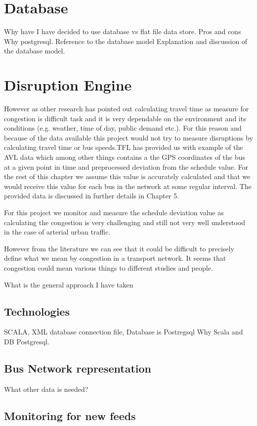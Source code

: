 \section{Database}
Why have I have decided to use database vs flat file data store. Pros and cons
Why postgresql. Reference to the database model
Explanation and discussion of the database model.

\section{Disruption Engine}
However as other research has pointed out \cite{1251929} calculating travel time as measure for congestion is difficult task and it is very dependable on the environment and its conditions (e.g. weather, time of day, public demand etc.). For this reason and because of the data available this project would not try to measure disruptions by calculating travel time or bus speeds.TFL has provided us with example of the AVL data which among other things contains a the GPS coordinates of the bus at a given point in time and preprocessed deviation from the schedule value. For the rest of this chapter we assume this value is accurately calculated and that we would receive this value for each bus in the network at some regular interval. The provided data is discussed in further details in Chapter 5.

For this project we monitor and measure the schedule deviation value as calculating the congestion is very challenging and still not very well understood in the case of arterial urban traffic.

However from the literature \cite{1251929} we can see that it could be difficult to precisely define what we mean by congestion in a transport network. It seems that congestion could mean various things to different studies and people.

What is the general approach I have taken
	\subsection{Technologies}
	SCALA, XML database connection file, Database is Postregsql
	Why Scala and DB Postgresql.
	\subsection{Bus Network representation}
	What other data is needed?
	\subsection{Monitoring for new feeds}
	
